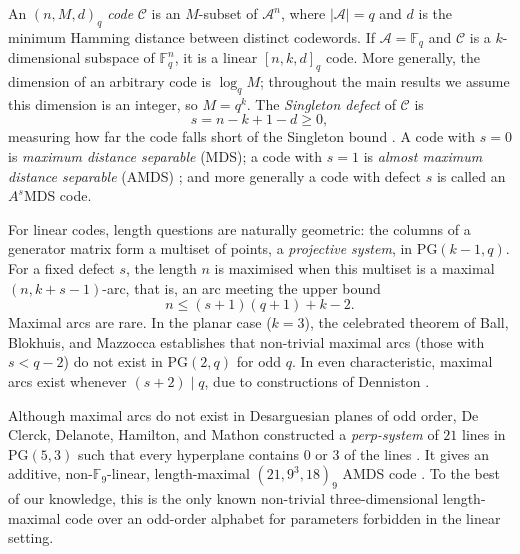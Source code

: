 \documentclass[12pt, letterpaper]{article}
\theoremstyle{plain}
\theoremstyle{definition}
\newcommand{\F}{\mathbb{F}}
\newcommand{\A}{{\mathcal{A}}}
\newcommand{\mc}[1]{\mathcal{#1}}
\begin{document}
	An \emph{$(n,M,d)_q$ code} $\mc C$ is an $M$-subset of $\A^n$, where $|\A|=q$ and $d$ is the minimum Hamming distance between distinct codewords. If $\A=\F_q$ and $\mc C$ is a $k$-dimensional subspace of $\F_q^n$, it is a linear $[n,k,d]_q$ code. More generally, the dimension of an arbitrary code is $\log_q M$; throughout the main results we assume this dimension is an integer, so $M=q^k$. The \emph{Singleton defect} of
	$\mathcal{C}$ is
	\[
	s = n - k + 1 - d \ge 0,
	\]
	measuring how far the code falls short of the Singleton bound \cite{Singleton1964, MacWilliamsSloane1977}. A code with $s = 0$ is \emph{maximum distance separable} (MDS); a code with $s = 1$ is \emph{almost maximum distance separable} (AMDS) \cite{DeBoer1996}; and more generally a code with defect $s$ is called an $A^s$MDS code.
	
	For linear codes, length questions are naturally geometric: the columns of a generator matrix form a multiset of points, a \emph{projective system}, in
	$\mathrm{PG}(k-1,q)$. For a fixed defect $s$, the length $n$ is maximised when this multiset is a maximal $(n, k+s-1)$-arc, that is, an arc meeting the upper bound
	\begin{equation}\label{eq:arc_bound}
		n \le (s+1)(q+1) + k - 2.
	\end{equation}
	Maximal arcs are rare. In the planar case ($k=3$), the celebrated theorem of Ball, Blokhuis, and Mazzocca \cite{Ball1997MaximalArcs} establishes that non-trivial maximal arcs (those with $s < q-2$) do not exist in $\mathrm{PG}(2,q)$ for odd $q$. In even characteristic, maximal arcs exist whenever $(s+2) \mid q$, due to constructions of Denniston \cite{Denniston1969}. 
	
	Although maximal arcs do not exist in Desarguesian planes of odd order, De Clerck, Delanote, Hamilton, and Mathon constructed a \emph{perp-system} of $21$ lines in $\mathrm{PG}(5,3)$ such that every hyperplane contains $0$ or $3$ of the lines \cite{DeClerck2002PerpSystems}. It gives an additive, non-$\F_9$-linear, length-maximal $(21,9^3,18)_9$ AMDS code \cite{alderson2026setssubspacesrestrictedhyperplane}. To the best of our knowledge, this is the only known non-trivial three-dimensional length-maximal code over an odd-order alphabet for parameters forbidden in the linear setting.
\end{document}
